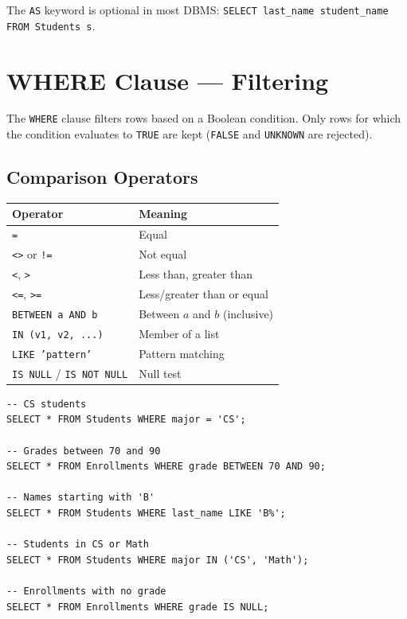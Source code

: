 The \texttt{AS} keyword is optional in most DBMS:
\texttt{SELECT last\_name student\_name FROM Students s}.

\section{WHERE Clause --- Filtering}

\begin{definition}
The \texttt{WHERE} clause filters rows based on a Boolean condition.
Only rows for which the condition evaluates to \texttt{TRUE} are kept
(\texttt{FALSE} and \texttt{UNKNOWN} are rejected).
\end{definition}

\subsection{Comparison Operators}

\begin{keyformulas}[title=\textbf{SQL Comparison Operators}]
\begin{center}
\begin{tabular}{ll}
\toprule
\textbf{Operator} & \textbf{Meaning} \\
\midrule
\texttt{=} & Equal \\
\texttt{<>} or \texttt{!=} & Not equal \\
\texttt{<}, \texttt{>} & Less than, greater than \\
\texttt{<=}, \texttt{>=} & Less/greater than or equal \\
\texttt{BETWEEN a AND b} & Between $a$ and $b$ (inclusive) \\
\texttt{IN (v1, v2, ...)} & Member of a list \\
\texttt{LIKE 'pattern'} & Pattern matching \\
\texttt{IS NULL} / \texttt{IS NOT NULL} & Null test \\
\bottomrule
\end{tabular}
\end{center}
\end{keyformulas}

\begin{codeblock}[title=\textbf{Filtering Examples}]
\begin{verbatim}
-- CS students
SELECT * FROM Students WHERE major = 'CS';

-- Grades between 70 and 90
SELECT * FROM Enrollments WHERE grade BETWEEN 70 AND 90;

-- Names starting with 'B'
SELECT * FROM Students WHERE last_name LIKE 'B%';

-- Students in CS or Math
SELECT * FROM Students WHERE major IN ('CS', 'Math');

-- Enrollments with no grade
SELECT * FROM Enrollments WHERE grade IS NULL;
\end{verbatim}
\end{codeblock}

